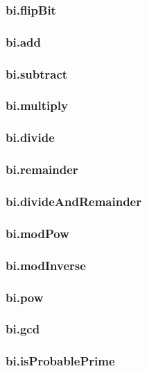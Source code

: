 \subsubsection*{bi.\+flip\+Bit}

\subsubsection*{bi.\+add}

\subsubsection*{bi.\+subtract}

\subsubsection*{bi.\+multiply}

\subsubsection*{bi.\+divide}

\subsubsection*{bi.\+remainder}

\subsubsection*{bi.\+divide\+And\+Remainder}

\subsubsection*{bi.\+mod\+Pow}

\subsubsection*{bi.\+mod\+Inverse}

\subsubsection*{bi.\+pow}

\subsubsection*{bi.\+gcd}

\subsubsection*{bi.\+is\+Probable\+Prime}